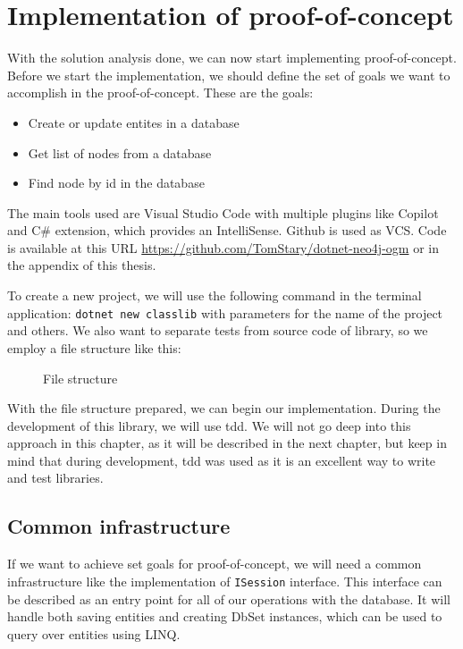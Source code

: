 \chapter {Implementation of proof-of-concept}

With the solution analysis done, we can now start implementing proof-of-concept.
Before we start the implementation, we should define the set of goals we want to accomplish in the proof-of-concept.
These are the goals:
\begin{itemize}
    \item {Create or update entites in a database}
    \item {Get list of nodes from a database}
    \item {Find node by id in the database}
\end{itemize}

The main tools used are Visual Studio Code with multiple plugins like Copilot and C\# extension, which provides an IntelliSense.
Github is used as VCS. Code is available at this URL \url{https://github.com/TomStary/dotnet-neo4j-ogm} or in the appendix of this thesis.

To create a new project, we will use the following command in the terminal application: \texttt{dotnet new classlib} with parameters for the name of the project and others.
We also want to separate tests from source code of library, so we employ a file structure like this:

\begin{figure}[H]
    \caption{File structure}
\end{figure}

With the file structure prepared, we can begin our implementation. During the development of this
library, we will use \acrfull{tdd}. We will not go deep into this approach in this chapter,
as it will be described in the next chapter, but keep in mind that during development, \acrshort{tdd} was used as it is an excellent way to write and test libraries.

\section {Common infrastructure}

If we want to achieve set goals for proof-of-concept, we will need a common infrastructure like the implementation of \texttt{ISession} interface.
This interface can be described as an entry point for all of our operations with the database. It will handle both saving entities and creating DbSet
instances, which can be used to query over entities using LINQ.

